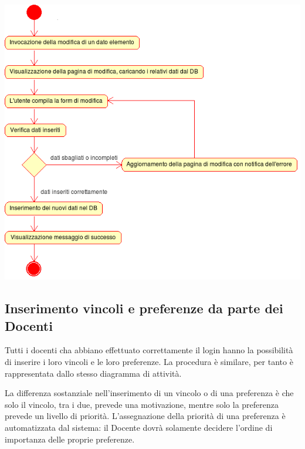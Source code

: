 \documentclass[11pt,a4paper]{article}
\begin{document}
\begin{center}
 \includegraphics[scale=0.85]{images/modifica_dati.png}
\end{center}

\newpage
\subsection{Inserimento vincoli e preferenze da parte dei Docenti}
Tutti i docenti cha abbiano effettuato correttamente il login hanno la possibilità di inserire i loro vincoli e le loro preferenze. La procedura è similare, per tanto è rappresentata dallo stesso diagramma di attività.

La differenza sostanziale nell'inserimento di un vincolo o di una preferenza è che solo il vincolo, tra i due, prevede una motivazione, mentre solo la preferenza prevede un livello di priorità. L'assegnazione della priorità di una preferenza è automatizzata dal sistema: il Docente dovrà solamente decidere l'ordine di importanza delle proprie preferenze.
\end{document}
